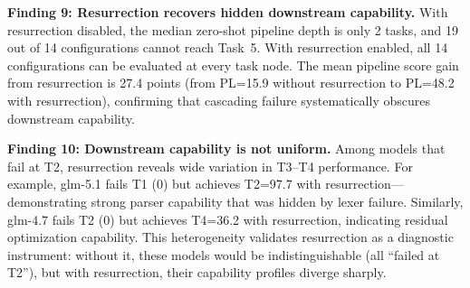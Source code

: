 \textbf{Finding 9: Resurrection recovers hidden downstream capability.}
With resurrection disabled, the median zero-shot pipeline depth is only 2 tasks, and 19 out of 14 configurations cannot reach Task~5.
With resurrection enabled, all 14 configurations can be evaluated at every task node.
The mean pipeline score gain from resurrection is 27.4 points (from PL=15.9 without resurrection to PL=48.2 with resurrection), confirming that cascading failure systematically obscures downstream capability.

\textbf{Finding 10: Downstream capability is not uniform.}
Among models that fail at T2, resurrection reveals wide variation in T3--T4 performance.
For example, glm-5.1 fails T1 (0) but achieves T2=97.7 with resurrection---demonstrating strong parser capability that was hidden by lexer failure.
Similarly, glm-4.7 fails T2 (0) but achieves T4=36.2 with resurrection, indicating residual optimization capability.
This heterogeneity validates resurrection as a diagnostic instrument: without it, these models would be indistinguishable (all ``failed at T2''), but with resurrection, their capability profiles diverge sharply.